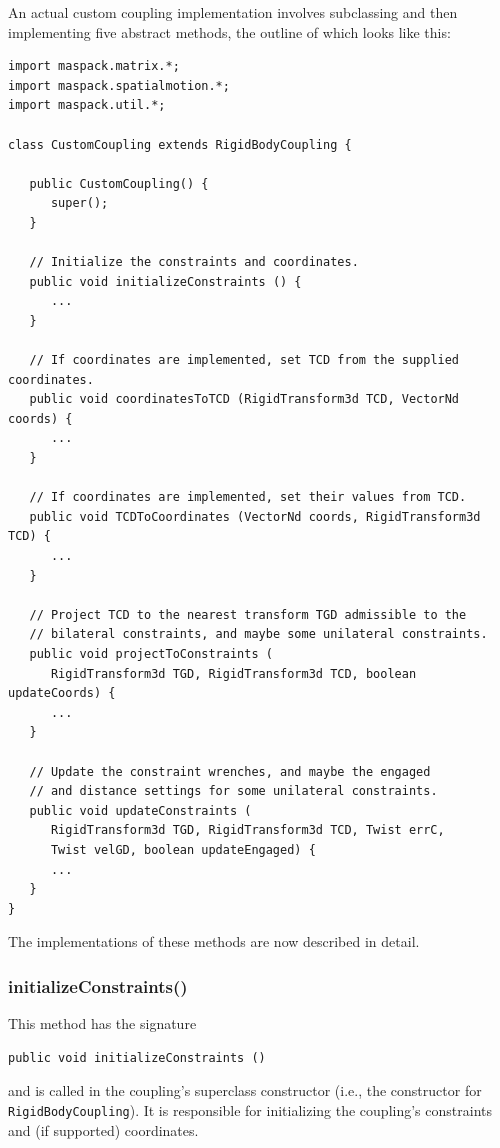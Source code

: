 An actual custom coupling implementation involves subclassing
 and then
implementing five abstract methods, the outline of which looks like
this:
%
\begin{lstlisting}[]
import maspack.matrix.*;
import maspack.spatialmotion.*;
import maspack.util.*;

class CustomCoupling extends RigidBodyCoupling {

   public CustomCoupling() {
      super();
   }

   // Initialize the constraints and coordinates.
   public void initializeConstraints () {
      ...
   }

   // If coordinates are implemented, set TCD from the supplied coordinates.
   public void coordinatesToTCD (RigidTransform3d TCD, VectorNd coords) {
      ...
   }

   // If coordinates are implemented, set their values from TCD.
   public void TCDToCoordinates (VectorNd coords, RigidTransform3d TCD) {
      ...
   }

   // Project TCD to the nearest transform TGD admissible to the
   // bilateral constraints, and maybe some unilateral constraints.
   public void projectToConstraints (
      RigidTransform3d TGD, RigidTransform3d TCD, boolean updateCoords) {
      ...
   }

   // Update the constraint wrenches, and maybe the engaged
   // and distance settings for some unilateral constraints.
   public void updateConstraints (
      RigidTransform3d TGD, RigidTransform3d TCD, Twist errC,
      Twist velGD, boolean updateEngaged) {
      ...
   }
}
\end{lstlisting}
%
The implementations of these methods are now described in detail.

\subsubsection*{initializeConstraints()}

This method has the signature
%
\begin{lstlisting}[]
  public void initializeConstraints ()
\end{lstlisting}
%
and is called in the coupling's superclass constructor (i.e., the
constructor for {\tt RigidBodyCoupling}).  It is responsible for
initializing the coupling's constraints and (if supported)
coordinates. 

